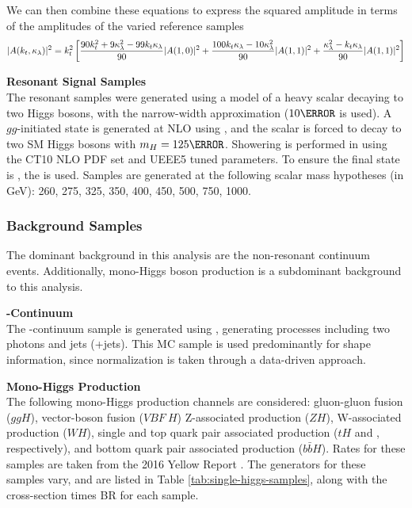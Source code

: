 We can then combine these equations to express the squared amplitude in terms of the amplitudes of the varied reference samples
\begin{equation}
  |A(k_t,\kappa_{\lambda})|^2 = k_t^2 \left[ 
    \frac{90 k_t^2 + 9\kappa_{\lambda}^2 - 99k_t\kappa_{\lambda}}{90}|A(1,0)|^2 +
    \frac{100 k_t\kappa_{\lambda} - 10\kappa_{\lambda}^2}{90}|A(1,1)|^2 +
    \frac{\kappa_{\lambda}^2 - k_t\kappa_{\lambda}}{90}|A(1,1)|^2 \right]
\end{equation}

\noindent\textbf{Resonant Signal Samples}\\
\indent The resonant samples were generated using a model of a heavy scalar decaying to two Higgs bosons, with the narrow-width approximation ($\unit{10}{\MeV}$ is used). A $gg$-initiated state is generated at NLO using \AMCatNLO, and the scalar is forced to decay to two \gls{SM} Higgs bosons with $m_H = \unit{125}{\GeV}$. Showering is performed in \HERWIGpp using the CT10 NLO \gls{PDF} set and UEEE5 tuned parameters. To ensure the final state is \yybb, the  is used. Samples are generated at the following scalar mass hypotheses (in GeV): 260, 275, 325, 350, 400, 450, 500, 750, 1000.


\subsubsection{Background Samples}

The dominant background in this analysis are the non-resonant \myy continuum events. Additionally, mono-Higgs boson production is a subdominant background to this analysis. 

\noindent\textbf{\yy-Continuum}\\
\indent The \yy-continuum sample is generated using \SHERPA, generating processes including two photons and jets (\yy+jets). This \gls{MC} sample is used predominantly for shape information, since normalization is taken through a data-driven approach. 

\noindent\textbf{Mono-Higgs Production}\\
\indent The following mono-Higgs production channels are considered: gluon-gluon fusion ($ggH$), vector-boson fusion ($VBF\ H$) Z-associated production ($ZH$), W-associated production ($WH$), single and top quark pair associated production ($tH$ and \tth, respectively), and bottom quark pair associated production ($b\bar{b}H$). Rates for these samples are taken from the 2016 Yellow Report \cite{yellow-report}. The generators for these samples vary, and are listed in Table \ref{tab:single-higgs-samples}, along with the cross-section times \gls{BR} for each sample.

